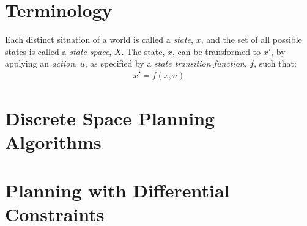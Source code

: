 




\section{Terminology}
Each distinct situation of a world is called a \textit{state}, $x$, and the set of all possible states is called a \textit{state space}, $X$. The state, $x$, can be transformed to $x'$, by applying an \textit{action}, $u$, as specified by a \textit{state transition function}, $f$, such that:
\begin{align}
	x' = f(x,u)
\end{align}
\section{Discrete Space Planning Algorithms}

\section{Planning with Differential Constraints}
